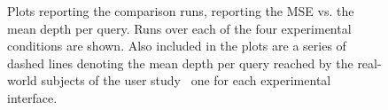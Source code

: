 \begin{figure}[p!]
    \centering
    \caption[Real-world comparisons over stopping strategies]{Plots reporting the comparison runs, reporting the MSE vs. the mean depth per query. Runs over each of the four experimental conditions are shown. Also included in the plots are a series of dashed lines denoting the mean depth per query reached by the real-world subjects of the user study \textemdash~one for each experimental interface.}
    \label{fig:ch8_sim_comparison_plots}
\end{figure}

